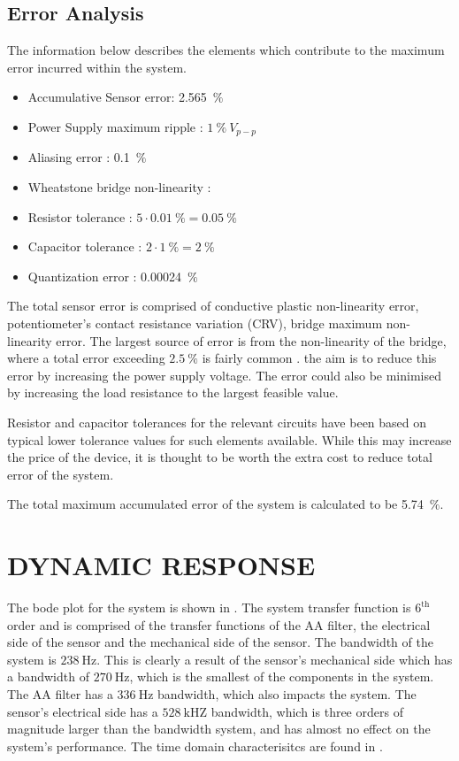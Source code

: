 \documentclass[10pt,twocolumn]{witseiepaper}
\begin{document}
\subsection{Error Analysis}

The information below describes the elements which contribute to the maximum error incurred within the system.

\begin{itemize}
	\item Accumulative Sensor error: 2.565~$\%$
	\item Power Supply maximum ripple : $1~\%~V_{p-p}$
	\item Aliasing error : 0.1~$\%$
	\item Wheatstone bridge non-linearity : 
	\item Resistor tolerance : $5\cdot0.01~\% = 0.05~\%$
	\item Capacitor tolerance : $2\cdot1~\% = 2~\%$
	\item Quantization error : 0.00024~$\%$
\end{itemize}

The total sensor error is comprised of conductive plastic non-linearity error, potentiometer's contact resistance variation (CRV), bridge maximum non-linearity error. The largest source of error is from the non-linearity of the bridge, where a total error exceeding $2.5~\%$ is fairly common \cite{nonlinearity}. the aim is to reduce this error by increasing the power supply voltage. The error could also be minimised by increasing the load resistance to the largest feasible value.

Resistor and capacitor tolerances for the relevant circuits have been based on typical lower tolerance values for such elements available. While this may increase the price of the device, it is thought to be worth the extra cost to reduce total error of the system.

The total maximum accumulated error of the system is calculated to be 5.74~$\%$. 

\section{DYNAMIC RESPONSE}

The bode plot for the system is shown in . The system transfer function is $\mathrm{6^{th}}$ order and is comprised of the transfer functions of the AA filter, the electrical side of the sensor and the mechanical side of the sensor. The bandwidth of the system is $238~\mathrm{Hz}$. This is clearly a result of the sensor's mechanical side which has a bandwidth of $270~\mathrm{Hz}$, which is the smallest of the components in the system. The AA filter has a $336~\mathrm{Hz}$ bandwidth, which also impacts the system. The sensor's electrical side has a $528~\mathrm{kHZ}$ bandwidth, which is three orders of magnitude larger than the  bandwidth system, and has almost no effect on the system's performance. The time domain characterisitcs are found in .
\end{document}
